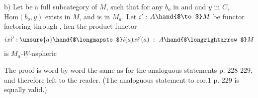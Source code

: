 b) Let  be a full subcategory of $M$, such that for any $b_o$ in  and
and $y$ in $C$,  $\underline{\mathrm{Hom}}(b_o,y)$  exists in $M$, and is in $M_a$.  Let $i'$ : $A \hand{$\to$} M$
be  functor factoring through  , hen the product functor 
\[ ixi' : \unsure{a} \hand{$\longmapsto$} i(a)xi'(a) \ : \ A \hand{$\longrightarrow$} M \]
is $M_a$-$\underline{W}$-aspheric 

The proof is word by word the same as for the analoguous statements
p. 228-229, and therefore left to the reader. (The analoguous statement
to cor.1  p. 229 is equally valid.)

